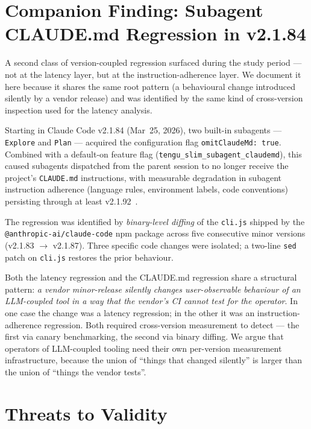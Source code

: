 \documentclass[11pt,a4paper]{article}
\begin{document}
\section{Companion Finding: Subagent CLAUDE.md Regression in v2.1.84}

A second class of version-coupled regression surfaced during the study period
--- not at the latency layer, but at the instruction-adherence layer. We
document it here because it shares the same root pattern (a behavioural change
introduced silently by a vendor release) and was identified by the same kind
of cross-version inspection used for the latency analysis.

Starting in Claude Code v2.1.84 (Mar~25, 2026), two built-in subagents ---
\texttt{Explore} and \texttt{Plan} --- acquired the configuration flag
\texttt{omitClaudeMd:\,true}. Combined with a default-on feature flag
(\texttt{tengu\_slim\_subagent\_claudemd}), this caused subagents dispatched
from the parent session to no longer receive the project's \texttt{CLAUDE.md}
instructions, with measurable degradation in subagent instruction adherence
(language rules, environment labels, code conventions) persisting through at
least v2.1.92~\cite{issue40459}.

The regression was identified by \emph{binary-level diffing} of the
\texttt{cli.js} shipped by the \texttt{@anthropic-ai/claude-code} npm package
across five consecutive minor versions (v2.1.83 $\to$ v2.1.87). Three
specific code changes were isolated; a two-line \texttt{sed} patch on
\texttt{cli.js} restores the prior behaviour.

Both the latency regression and the CLAUDE.md regression share a structural
pattern: \emph{a vendor minor-release silently changes user-observable
behaviour of an LLM-coupled tool in a way that the vendor's CI cannot test for
the operator}. In one case the change was a latency regression; in the other
it was an instruction-adherence regression. Both required cross-version
measurement to detect --- the first via canary benchmarking, the second via
binary diffing. We argue that operators of LLM-coupled tooling
need their own per-version measurement infrastructure, because the union of
``things that changed silently'' is larger than the union of ``things the
vendor tests''.

\section{Threats to Validity}
\end{document}
